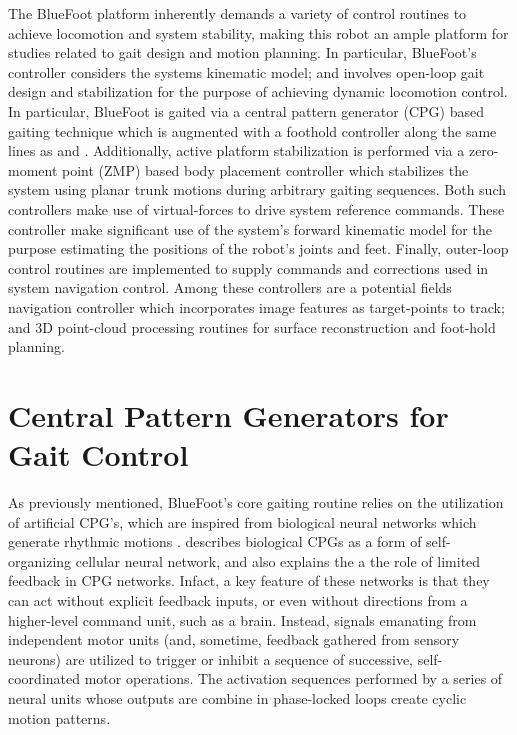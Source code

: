 		The BlueFoot platform inherently demands a variety of control routines to achieve locomotion and system stability, making this robot an ample platform for studies related to gait design and motion planning. In particular, BlueFoot's controller considers the systems kinematic model; and involves open-loop gait design and stabilization for the purpose of achieving dynamic locomotion control. In particular, BlueFoot is gaited via a central pattern generator (CPG) based gaiting technique which is augmented with a foothold controller along the same lines as \cite{Ajallooeian2013} and \cite{Rutishauser2008}. Additionally, active platform stabilization is performed via a zero-moment point (ZMP) based body placement controller which stabilizes the system using planar trunk motions during arbitrary gaiting sequences. Both such controllers make use of virtual-forces to drive system reference commands. These controller make significant use of the system's forward kinematic model for the purpose estimating the positions of the robot's joints and feet. Finally, outer-loop control routines are implemented to supply commands and corrections used in system navigation control. Among these controllers are a potential fields navigation controller which incorporates image features as target-points to track; and 3D point-cloud processing routines for surface reconstruction and foot-hold planning.

		\section{Central Pattern Generators for Gait Control}

		As previously mentioned, BlueFoot's core gaiting routine relies on the utilization of artificial CPG's, which are inspired from biological neural networks which generate rhythmic motions \cite{Ijspeert2008}. \cite{Arena2000} describes biological CPGs as a form of self-organizing cellular neural network, and also explains the a the role of limited feedback in CPG networks. Infact, a key feature of these networks is that they can act without explicit feedback inputs, or even without directions from a higher-level command unit, such as a brain. Instead, signals emanating from independent motor units (and, sometime, feedback gathered from sensory neurons) are utilized to trigger or inhibit a sequence of successive, self-coordinated motor operations. The activation sequences performed by a series of neural units whose outputs are combine in phase-locked loops create cyclic motion patterns. 

